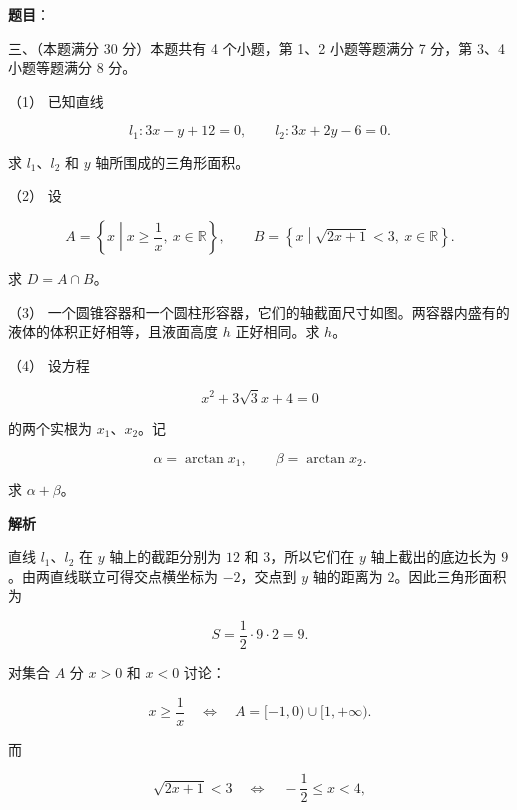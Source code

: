 \begin{answer}

\textbf{题目}：

三、（本题满分 30 分）本题共有 4 个小题，第 1、2 小题等题满分 7 分，第 3、4 小题等题满分 8 分。

（1） 已知直线

\nopagebreak[4]
\[
l_1:3x-y+12=0,\qquad l_2:3x+2y-6=0.
\]

求 $l_1$、$l_2$ 和 $y$ 轴所围成的三角形面积。

（2） 设

\nopagebreak[4]
\[
A=\left\{x\mathrel{}\middle|\mathrel{}x\ge\frac1x,\ x\in\mathbb R\right\},
\qquad
B=\left\{x\mathrel{}\middle|\mathrel{}\sqrt{2x+1}<3,\ x\in\mathbb R\right\}.
\]

求 $D=A\cap B$。

（3） 一个圆锥容器和一个圆柱形容器，它们的轴截面尺寸如图。两容器内盛有的液体的体积正好相等，且液面高度 $h$ 正好相同。求 $h$。
\nopagebreak[4]
\begin{center}\end{center}
\nopagebreak[4]
（4） 设方程

\nopagebreak[4]
\[
x^2+3\sqrt3x+4=0
\]

的两个实根为 $x_1\text{、}x_2$。记

\nopagebreak[4]
\[
\alpha=\arctan x_1,\qquad \beta=\arctan x_2.
\]

求 $\alpha+\beta$。

\textbf{解析}


直线 $l_1$、$l_2$ 在 $y$ 轴上的截距分别为 $12$ 和 $3$，所以它们在 $y$ 轴上截出的底边长为 $9$。由两直线联立可得交点横坐标为 $-2$，交点到 $y$ 轴的距离为 $2$。因此三角形面积为

\nopagebreak[4]
\[
S=\frac12\cdot9\cdot2=9.
\]


对集合 $A$ 分 $x>0$ 和 $x<0$ 讨论：

\nopagebreak[4]
\[
x\ge\frac1x
\quad\Longleftrightarrow\quad
A=[-1,0)\cup[1,+\infty).
\]

而

\nopagebreak[4]
\[
\sqrt{2x+1}<3
\quad\Longleftrightarrow\quad
-\frac12\le x<4,
\]


\end{answer}
